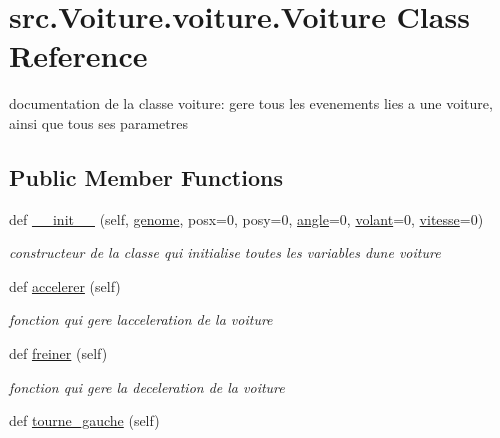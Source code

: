 \hypertarget{classsrc_1_1_voiture_1_1voiture_1_1_voiture}{}\section{src.\+Voiture.\+voiture.\+Voiture Class Reference}
\label{classsrc_1_1_voiture_1_1voiture_1_1_voiture}


documentation de la classe voiture\+: gere tous les evenements lies a une voiture, ainsi que tous ses parametres  


\subsection*{Public Member Functions}
\begin{DoxyCompactItemize}
\item 
def \hyperlink{classsrc_1_1_voiture_1_1voiture_1_1_voiture_a5f36479e14f3127db26dfc408a626edf}{\+\_\+\+\_\+init\+\_\+\+\_\+} (self, \hyperlink{classsrc_1_1_voiture_1_1voiture_1_1_voiture_afbb9cab19661eb3eb38def8c49c14dc3}{genome}, posx=0, posy=0, \hyperlink{classsrc_1_1_voiture_1_1voiture_1_1_voiture_a808deb309ce297eb0493e9f6239a2e23}{angle}=0, \hyperlink{classsrc_1_1_voiture_1_1voiture_1_1_voiture_a2757624ed52879d1e8b5ea742b2146e2}{volant}=0, \hyperlink{classsrc_1_1_voiture_1_1voiture_1_1_voiture_aaabd3a8eee61977f2e0eb8e33c6ffe10}{vitesse}=0)
\begin{DoxyCompactList}\small\item\em constructeur de la classe qui initialise toutes les variables d\textquotesingle{}une voiture \end{DoxyCompactList}\item 
def \hyperlink{classsrc_1_1_voiture_1_1voiture_1_1_voiture_a0800c81e2f1de13938bf6b61787dc781}{accelerer} (self)
\begin{DoxyCompactList}\small\item\em fonction qui gere l\textquotesingle{}acceleration de la voiture \end{DoxyCompactList}\item 
def \hyperlink{classsrc_1_1_voiture_1_1voiture_1_1_voiture_af163e07ac6317ff655531984a56b0f26}{freiner} (self)
\begin{DoxyCompactList}\small\item\em fonction qui gere la deceleration de la voiture \end{DoxyCompactList}\item 
def \hyperlink{classsrc_1_1_voiture_1_1voiture_1_1_voiture_ac65408426057b65e6e1da05ae56befd5}{tourne\+\_\+gauche} (self)

\end{DoxyCompactItemize}

